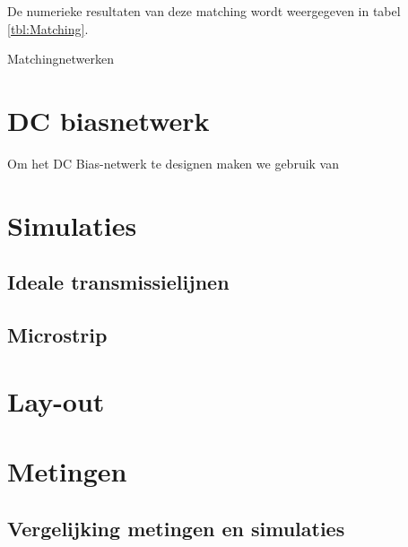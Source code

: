   De numerieke resultaten van deze matching wordt weergegeven in tabel \ref{tbl:Matching}.

  \begin{table}[h!]
     \begin{center}
       \caption{Matchingnetwerken}
       \label{tbl:Matching}
       
     \end{center}
  \end{table}


\section{DC biasnetwerk}
  Om het DC Bias-netwerk te designen maken we gebruik van \cite{Gonzalez}

\section{Simulaties}
  \subsection{Ideale transmissielijnen}
  \subsection{Microstrip}

\section{Lay-out}

\section{Metingen}
\subsection{Vergelijking metingen en simulaties}




